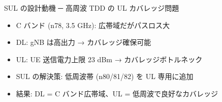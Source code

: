 \begin{frame}{SUL の設計動機 ─ 高周波 TDD の UL カバレッジ問題}
\begin{itemize}
  \item C バンド (n78, 3.5 GHz): 広帯域だがパスロス大
  \item DL: gNB は高出力 → カバレッジ確保可能
  \item UL: UE 送信電力上限 23 dBm → カバレッジボトルネック
  \item SUL の解決策: 低周波帯 (n80/81/82) を UL 専用に追加
  \item 結果: DL = C バンド広帯域、UL = 低周波で良好なカバレッジ
\end{itemize}
\end{frame}
